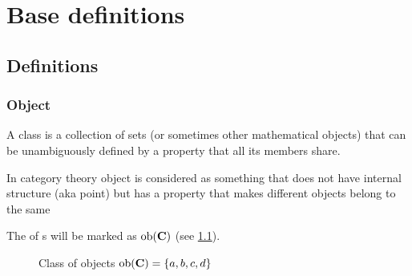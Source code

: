 \chapter{Base definitions}

\section{Definitions}

\subsection{Object}

\begin{definition}[Class]
  A class is a collection of sets (or sometimes other mathematical
  objects) that can be unambiguously defined by a property that all
  its members share. 
  \label{def:class}
\end{definition}

\begin{definition}[Object]
  \label{def:object}
  In category theory object is considered as something that does not
  have internal structure (aka point) but has a property that makes
  different objects belong to the same 
\end{definition}

\begin{remark}
  \label{rem:objclass}
  The  of s will be marked as 
  $\mathrm{ob}(\mathbf{C})$ (see \cref{fig:class_of_objects}).
\end{remark}

\begin{figure}
  \centering
  \caption{Class of objects $\mathrm{ob}(\mathbf{C})=\{a,b,c,d\}$}
  \label{fig:class_of_objects}
\end{figure}

